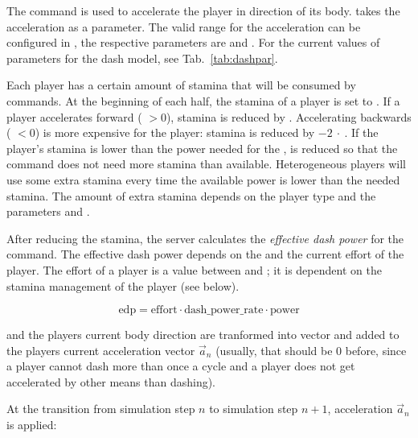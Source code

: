 The  command is used to accelerate the player in
direction of its body.  takes the acceleration
 as a parameter. The valid range for the acceleration
 can be configured in , the respective
parameters are  and . For the
current values of parameters for the dash model, see
Tab.~\ref{tab:dashpar}. 

Each player has a certain amount of stamina that will be consumed by
 commands. At the beginning of each half, the stamina
of a player is set to . If a player accelerates
forward ( $> 0$), stamina is reduced by .
Accelerating backwards ( $< 0$) is more expensive for the
player: stamina is reduced by $-2~\cdot~$. If the
player's stamina is lower than the power needed for the
,  is reduced so that the 
command does not need more stamina than available. Heterogeneous
players will use some extra stamina every time the available power is
lower than the needed stamina. The amount of extra stamina depends on
the player type and the parameters 
and .

After reducing the stamina, the server calculates the \emph{effective
  dash power} for the  command. The effective dash
power  depends on the  and the
current effort of the player. The effort of a player is a value
between  and ; it is dependent
on the stamina management of the player (see below).

\begin{equation}
  \label{eq:effectivedash}
  \mathrm{edp} = \mathrm{effort} \cdot \mathrm{dash\_power\_rate} \cdot \mathrm{power}
\end{equation}

 and the players current body direction are tranformed
into vector and added to the players current acceleration
vector $\vec{a}_n$ (usually, that should be 0 before, since a player
cannot dash more than once a cycle and a player does not get
accelerated by other means than dashing).

At the transition from simulation step $n$ to simulation step $n +
1$, acceleration $\vec{a}_n$ is applied:

